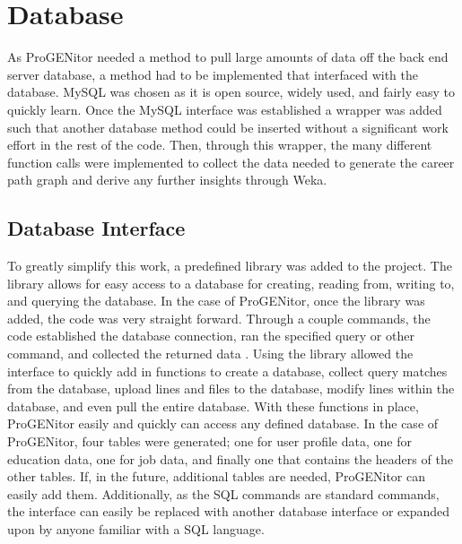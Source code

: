 \section{Database}
\label{sect:database}
As ProGENitor needed a method to pull large amounts of data off the back end
server database, a method had to be implemented that interfaced with
the database.  MySQL was chosen as it is open source, widely used, and fairly
easy to quickly learn.  Once the MySQL interface was established a wrapper was
added such that another database method could be inserted without a significant
work effort in the rest of the code.  Then, through this wrapper, the many
different function calls were implemented to collect the data needed to generate
the career path graph and derive any further insights through Weka.

\subsection{Database Interface}
To greatly simplify this work, a predefined library was added to the project.  The 
library allows for easy access to a database for creating, reading from,
writing to, and querying the database.  In the case of ProGENitor, once the
library was added, the code was very straight forward.  Through a couple
commands, the code established the database connection, ran the specified query
or other command, and collected the returned data \cite{sqlite}.  Using the
library allowed the interface to quickly add in functions to create
a database, collect query matches from the database, upload lines and files to
the database, modify lines within the database, and even pull the entire
database.  With these functions in place, ProGENitor easily and quickly can
access any defined database.  In the case of ProGENitor, four tables were
generated; one for user profile data, one for education data, one for job data,
and finally one that contains the headers of the other tables.  If, in the
future, additional tables are needed, ProGENitor can easily add them. 
Additionally, as the SQL commands are standard commands, the interface can
easily be replaced with another database interface or expanded upon by anyone
familiar with a SQL language.

